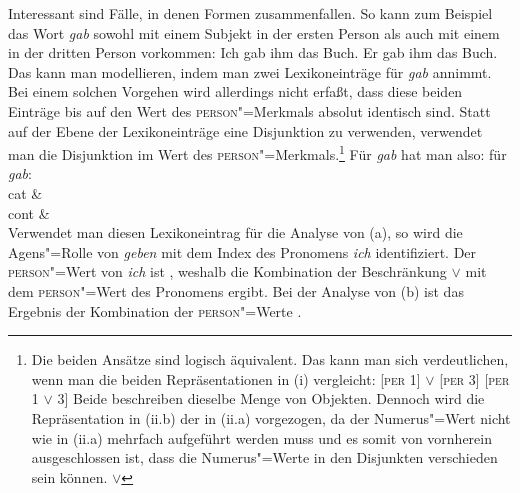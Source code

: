 Interessant sind Fälle, in denen Formen zusammenfallen. So kann zum Beispiel das Wort
\emph{gab} sowohl mit einem Subjekt in der ersten Person als auch mit einem in der dritten Person vorkommen:
\eal
\ex Ich gab ihm das Buch.
\ex Er  gab ihm das Buch.
\zl
Das kann man modellieren, indem man zwei Lexikoneinträge für \emph{gab} annimmt. Bei einem solchen Vorgehen
wird allerdings nicht erfaßt, dass diese beiden Einträge bis auf den Wert des \textsc{person}"=Merkmals absolut
identisch sind. Statt auf der Ebene der Lexikoneinträge eine Disjunktion zu verwenden, verwendet man
die Disjunktion im Wert des \textsc{person}"=Merkmals.\footnote{
  Die beiden Ansätze sind logisch äquivalent. Das kann man sich verdeutlichen, wenn man die
  beiden Repräsentationen in (i) vergleicht:
  \eal
  \ex {} [\textsc{per} 1] $\vee$ [\textsc{per} 3]
  \ex {} [\textsc{per} 1 $\vee$ 3]
  \zl
  Beide beschreiben dieselbe Menge von Objekten. Dennoch wird die Repräsentation in (ii.b) der
  in (ii.a) vorgezogen, da der Numerus"=Wert nicht wie in (ii.a) mehrfach aufgeführt werden
  muss und es somit von vornherein ausgeschlossen ist, dass die Numerus"=Werte in den Disjunkten
  verschieden sein können.
  \eal
  \ex {}  $\vee$ 
  \ex {}
  \zllast
}
Für \emph{gab} hat man also:
\ea
\label{le-gab}
\localw für \emph{gab}:\\
\ms
{ cat &  \\
  cont &   \\
}
\z
Verwendet man diesen Lexikoneintrag für die Analyse von (a), so wird die Agens"=Rolle
von \emph{geben} mit dem Index des Pronomens \emph{ich} identifiziert. Der \textsc{person}"=Wert von
\emph{ich} ist , weshalb die Kombination der Beschränkung  $\vee$  mit dem \textsc{person}"=Wert 
des Pronomens  ergibt. Bei der Analyse von (b) ist das Ergebnis der Kombination
der \textsc{person}"=Werte .

